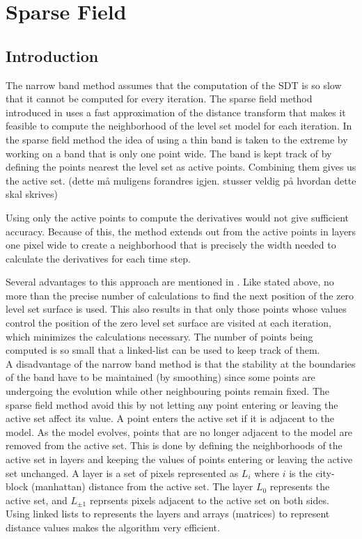 \section{Sparse Field}

\subsection{Introduction}

The narrow band  method assumes that the computation of the SDT is so slow that it cannot be computed for every iteration. The sparse field method introduced in \cite{whitaker89} uses a fast approximation of the distance transform that makes it feasible to compute the neighborhood of the level set model for each iteration. In the sparse field method the idea of using a thin band is taken to the extreme by working on a band that is only one point wide. The band is kept track of by defining the points nearest the level set as active points. Combining them gives us the active set. (dette må muligens forandres igjen. stusser veldig på hvordan dette skal skrives)

Using only the active points to compute the derivatives would not give sufficient accuracy. Because of this, the method extends out from the active points in layers one pixel wide to create a neighborhood that is precisely the width needed to calculate the derivatives for each time step.


Several advantages to this approach are mentioned in \cite{whitaker89}. Like stated above, no more than the precise number of calculations to find the next position of the zero level set surface is used. This also results in that only those points whose values control the position of the zero level set surface are visited at each iteration, which minimizes the calculations necessary. The number of points being computed is so small that a linked-list can be used to keep track of them. \\




A disadvantage of the narrow band method is that the stability at the boundaries of the band have to be maintained (by smoothing) since some points are undergoing the evolution while other neighbouring points remain fixed. The sparse field method avoid this by not letting any point entering or leaving the active set affect its value. A point enters the active set if it is adjacent to the model. As the model evolves, points that are no longer adjacent to the model are removed from the active set. This is done by defining the neighborhoods of the active set in layers and keeping the values of points entering or leaving the active set unchanged. A layer is a set of pixels represented as \(L_{i}\) where \(i\) is the city-block (manhattan) distance from the active set. The layer \(L_{0}\) represents the active set, and \(L_{\pm 1}\) reprsents pixels adjacent to the active set on both sides. Using linked lists to represents the layers and arrays (matrices) to represent distance values makes the algorithm very efficient. 

